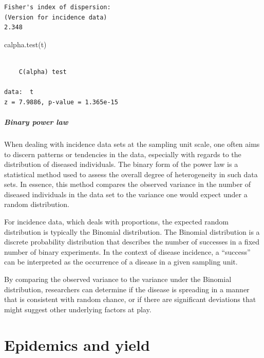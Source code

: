 \documentclass[
  letterpaper,
]{book}
\newenvironment{Shaded}{\begin{snugshade}}{\end{snugshade}}
\newcommand{\FunctionTok}[1]{\textcolor[rgb]{0.28,0.35,0.67}{#1}}
\newcommand{\NormalTok}[1]{\textcolor[rgb]{0.00,0.23,0.31}{#1}}
\begin{document}
\begin{verbatim}
Fisher's index of dispersion:
(Version for incidence data)
2.348
\end{verbatim}

\begin{Shaded}
\begin{Highlighting}[]
\FunctionTok{calpha.test}\NormalTok{(t)}
\end{Highlighting}
\end{Shaded}

\begin{verbatim}

    C(alpha) test

data:  t
z = 7.9886, p-value = 1.365e-15
\end{verbatim}

\hypertarget{binary-power-law}{%
\subsubsection{Binary power law}\label{binary-power-law}}

When dealing with incidence data sets at the sampling unit scale, one
often aims to discern patterns or tendencies in the data, especially
with regards to the distribution of diseased individuals. The binary
form of the power law is a statistical method used to assess the overall
degree of heterogeneity in such data sets. In essence, this method
compares the observed variance in the number of diseased individuals in
the data set to the variance one would expect under a random
distribution.

For incidence data, which deals with proportions, the expected random
distribution is typically the Binomial distribution. The Binomial
distribution is a discrete probability distribution that describes the
number of successes in a fixed number of binary experiments. In the
context of disease incidence, a ``success'' can be interpreted as the
occurrence of a disease in a given sampling unit.

By comparing the observed variance to the variance under the Binomial
distribution, researchers can determine if the disease is spreading in a
manner that is consistent with random chance, or if there are
significant deviations that might suggest other underlying factors at
play.

\part{Epidemics and yield}
\end{document}
